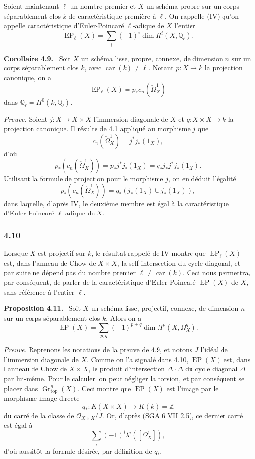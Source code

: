 \documentclass[11pt]{article}
\newenvironment{statement}[1]{\par\medskip\noindent\textbf{#1.}\ }{\par\medskip}
\begin{document}
Soient maintenant $\ell$ un nombre premier et $X$ un schéma propre sur un corps séparablement clos $k$ de caractéristique première à $\ell$. On rappelle (IV) qu'on appelle caractéristique d'Euler-Poincaré $\ell$-adique de $X$ l'entier
\[
\operatorname{EP}_\ell(X)=\sum_i(-1)^i\dim H^i(X,\mathbb Q_\ell).
\]

\begin{statement}{Corollaire 4.9}
Soit $X$ un schéma lisse, propre, connexe, de dimension $n$ sur un corps séparablement clos $k$, avec $\operatorname{car}(k)\ne\ell$. Notant $p:X\to k$ la projection canonique, on a
\[
\operatorname{EP}_\ell(X)=p_*c_n(\check\Omega^1_X)
\]
dans $\mathbb Q_\ell=H^0(k,\mathbb Q_\ell)$.
\end{statement}

\emph{Preuve.} Soient $j:X\to X\times X$ l'immersion diagonale de $X$ et $q:X\times X\to k$ la projection canonique. Il résulte de 4.1 appliqué au morphisme $j$ que
\[
c_n(\check\Omega^1_X)=j^*j_*(1_X),
\]
d'où
\[
p_*(c_n(\check\Omega^1_X))=p_*j^*j_*(1_X)=q_*j_*j^*j_*(1_X).
\]
Utilisant la formule de projection pour le morphisme $j$, on en déduit l'égalité
\[
p_*(c_n(\check\Omega^1_X))=q_*(j_*(1_X)\cup j_*(1_X)),
\]
dans laquelle, d'après IV, le deuxième membre est égal à la caractéristique d'Euler-Poincaré $\ell$-adique de $X$.

\subsubsection*{4.10}
Lorsque $X$ est projectif sur $k$, le résultat rappelé de IV montre que $\operatorname{EP}_\ell(X)$ est, dans l'anneau de Chow de $X\times X$, la self-intersection du cycle diagonal, et par suite ne dépend pas du nombre premier $\ell\ne\operatorname{car}(k)$. Ceci nous permettra, par conséquent, de parler de la caractéristique d'Euler-Poincaré $\operatorname{EP}(X)$ de $X$, sans référence à l'entier $\ell$.

\begin{statement}{Proposition 4.11}
Soit $X$ un schéma lisse, projectif, connexe, de dimension $n$ sur un corps séparablement clos $k$. Alors on a
\[
\operatorname{EP}(X)=\sum_{p,q}(-1)^{p+q}\dim H^p(X,\Omega_X^q).
\]
\end{statement}

\emph{Preuve.} Reprenons les notations de la preuve de 4.9, et notons $J$ l'idéal de l'immersion diagonale de $X$. Comme on l'a signalé dans 4.10, $\operatorname{EP}(X)$ est, dans l'anneau de Chow de $X\times X$, le produit d'intersection $\Delta\cdot\Delta$ du cycle diagonal $\Delta$ par lui-même. Pour le calculer, on peut négliger la torsion, et par conséquent se placer dans $\operatorname{Gr}_{\mathrm{top}}^n(X)$. Ceci montre que $\operatorname{EP}(X)$ est l'image par le morphisme image directe
\[
q_*:K(X\times X)\to K(k)=\mathbb Z
\]
du carré de la classe de $\mathcal O_{X\times X}/J$. Or, d'après (SGA 6 VII 2.5), ce dernier carré est égal à
\[
\sum_i(-1)^i\lambda^i([\Omega_X^1]),
\]
d'où aussitôt la formule désirée, par définition de $q_*$.
\end{document}
